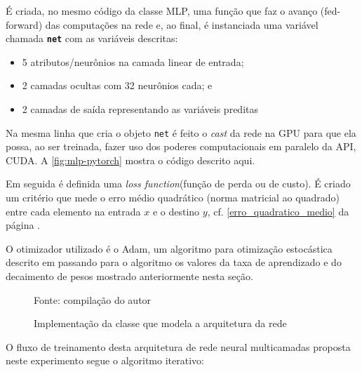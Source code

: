 É criada, no mesmo código da classe MLP, uma função que faz o avanço (fed-forward) das computações na rede e, ao final, é instanciada uma variável chamada \texttt{\textbf{net}} com as variáveis descritas: 
\begin{itemize}
	\item 5 atributos/neurônios na camada linear de entrada;
	\item 2 camadas ocultas com 32 neurônios cada; e
	\item 2 camadas de saída representando as variáveis preditas
\end{itemize}

Na mesma linha que cria o objeto \texttt{net} é feito o \textit{cast} da rede na GPU para que ela possa, ao ser treinada, fazer uso dos poderes computacionais em paralelo da API, CUDA. A \autoref{fig:mlp-pytorch} mostra o código descrito aqui.

Em seguida é definida uma \textit{loss function}(função de perda ou de custo). É criado um critério que mede o erro médio quadrático (norma matricial ao quadrado) entre cada elemento na entrada $x$ e o destino $y$, cf. \autoref{erro_quadratico_medio} da página . 

O otimizador utilizado é o Adam, um algoritmo para otimização estocástica descrito em  passando para o algoritmo os valores da taxa de aprendizado e do decaimento de pesos mostrado anteriormente nesta seção.

\begin{figure}[H]
	\centering
	\caption{Implementação da classe que modela a arquitetura da rede}
	
	\label{fig:mlp-pytorch}
	{\scriptsize Fonte: compilação do autor}
\end{figure}

O fluxo de treinamento desta arquitetura de rede neural multicamadas proposta neste experimento segue o algoritmo iterativo:

